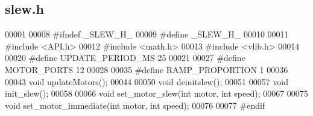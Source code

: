 \subsection{slew.\+h}
\label{a00065_source}

\begin{DoxyCode}
00001 
00008 \textcolor{preprocessor}{#ifndef \_SLEW\_H\_}
00009 \textcolor{preprocessor}{#define \_SLEW\_H\_}
00010 
00011 \textcolor{preprocessor}{#include <API.h>}
00012 \textcolor{preprocessor}{#include <math.h>}
00013 \textcolor{preprocessor}{#include <vlib.h>}
00014 
00020 \textcolor{preprocessor}{#define UPDATE\_PERIOD\_MS 25}
00021 
00027 \textcolor{preprocessor}{#define MOTOR\_PORTS 12}
00028 
00035 \textcolor{preprocessor}{#define RAMP\_PROPORTION 1}
00036 
00043 \textcolor{keywordtype}{void} updateMotors();
00044 
00050 \textcolor{keywordtype}{void} deinitslew();
00051 
00057 \textcolor{keywordtype}{void} init_slew();
00058 
00066 \textcolor{keywordtype}{void} set_motor_slew(\textcolor{keywordtype}{int} motor, \textcolor{keywordtype}{int} speed);
00067 
00075 \textcolor{keywordtype}{void} set_motor_immediate(\textcolor{keywordtype}{int} motor, \textcolor{keywordtype}{int} speed);
00076 
00077 \textcolor{preprocessor}{#endif}
\end{DoxyCode}
